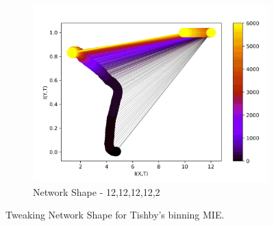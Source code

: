 \documentclass[dissertation.tex]{subfiles}
\begin{document}
\begin{figure}[ht]
  \hfill
  \begin{subfigure}[t]{0.32\textwidth}
    \centering
    \includegraphics[width=\textwidth]{figs/eval/networkShape/Binning12,12,12.jpg}
    \caption{
      Network Shape - 12,12,12,12,2
    }
    \label{figNetworkShape3}
  \end{subfigure}
  \hfill
  \caption{
      Tweaking Network Shape for Tishby's binning MIE. 
    }
  \label{figNetworkShapes}
\end{figure}
\end{document}
